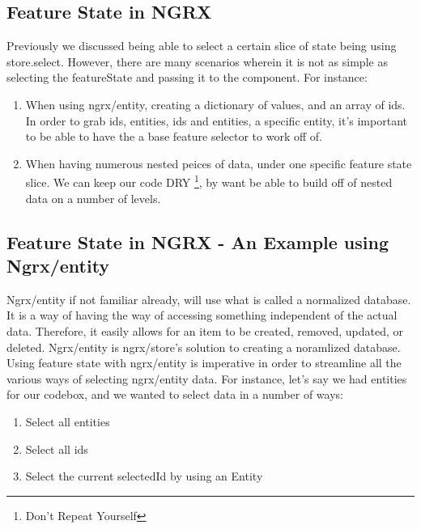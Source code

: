 \subsection{ Feature State in NGRX }
Previously we discussed being able to select a certain slice of state being
using store.select. However, there are many scenarios wherein it is not
as simple as selecting the featureState and passing it to the component. For
instance:
\begin{enumerate}
  \item When using ngrx/entity, creating a dictionary of values, and an array
  of ids. In order to grab ids, entities, ids and entities, a specific entity,
  it's important to be able to have the a base feature selector to work off of.
  \item When having numerous nested peices of data, under one specific feature
  state slice. We can keep our code DRY \footnote{Don't Repeat Yourself}, by
  want be able to build off of nested data on a number of levels.
\end{enumerate}


\subsection{ Feature State in NGRX - An Example using Ngrx/entity}

Ngrx/entity if not familiar already, will use what is called a normalized
database. It is a way of having the way of accessing something independent of
the actual data. Therefore, it easily allows for an item to be created, removed,
updated, or deleted. Ngrx/entity is ngrx/store's solution to creating a
noramlized database. Using feature state with ngrx/entity is imperative in order
to streamline all the various ways of selecting ngrx/entity data. For instance,
let's say we had entities for our codebox, and we wanted to select data in a
number of ways:

\begin{enumerate}
  \item Select all entities
  \item Select all ids
  \item Select the current selectedId by using an Entity
\end{enumerate}

